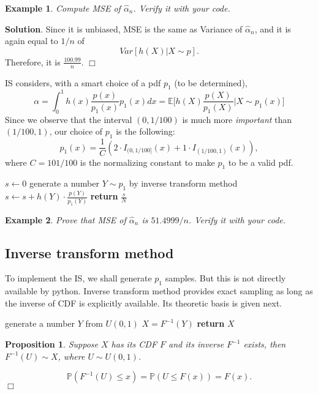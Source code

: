 \documentclass{article}
\newtheorem{proposition}[theorem]{Proposition}
\newtheorem{example}{Example}
\newenvironment{proof}{\noindent {\sc Proof:}}{$\Box$} %
\begin{document}
\begin{example}
 Compute MSE of $\hat \alpha_{n}$. Verify it with your code.
\end{example}
{\bf Solution}.
Since it is unbiased, MSE is the same as Variance of $\hat \alpha_{n}$, 
and it is again equal to $1/n$ of 
$$Var[h(X) | X\sim p].
$$Therefore, it is
$\frac{100.99}{n}$. \hfill $\Box$


IS considers, with a smart choice of a pdf $p_{1}$ (to be determined), 
$$\alpha = \int_{0}^{1} h(x)\frac{p(x)}{p_{1}(x)} p_{1} (x) dx= 
\mathbb E \Big[h(X) \frac{p(X)}{p_{1}(X)} \Big| X\sim p_{1}(x) \Big] $$
Since we observe that the interval $(0, 1/100)$ is much more {\it important}
than $(1/100, 1)$, our choice of $p_{1}$ is the following:
$$p_{1} (x) = \frac{1}{C} (2 \cdot I_{(0, 1/100]} (x) + 1 \cdot I_{(1/100, 1)}(x)),$$
where
$C = 101/100$ is the normalizing constant to make $p_{1}$ to be a valid pdf.

\begin{algorithm}\label{pc:is}
\caption{Integral by importance sampling - Example \ref{ex:integral}}
\label{alg:mcpi}
\begin{algorithmic}[1]
\State  $s \gets 0$ 
	\State generate a number $Y \sim p_1$ by inverse transform method 
	\State $s\gets s+ h(Y) \cdot \frac{p(Y)}{p_1(Y)}$ 
\EndFor
\State \textbf{return} $\frac{s}{N}$ 
\EndProcedure
\end{algorithmic}
\end{algorithm}

 


\begin{example}
 Prove that MSE of $\hat \alpha_{n}$ is $51.4999/n$. Verify it with your code.
\end{example}

\subsection{Inverse transform method}
To implement the IS, we  shall generate $p_{1}$ samples.
But this is not directly available by python. 
Inverse transform method provides exact sampling as long as the inverse of CDF is explicitly available. Its theoretic basis is given next.

\begin{algorithm}\label{pc:itm}
\caption{ITM sample generation for $X\sim F$ given $F^{-1}$}
\label{alg:mcpi}
\begin{algorithmic}[1]
\State generate a number $Y$ from $U(0,1)$ 
\State $X = F^{-1}(Y)$
\State \textbf{return} $X$ 
\EndProcedure
\end{algorithmic}
\end{algorithm}


\begin{proposition}
 Suppose $X$ has its CDF $F$ and its inverse $F^{-1}$ exists, then 
 $F^{-1}(U) \sim X$, where $U\sim U(0,1)$.
\end{proposition}
\begin{proof}
 $$\mathbb P(F^{-1}(U) \le x) = \mathbb P(U\le F(x)) = F(x).$$
\end{proof}
\end{document}
